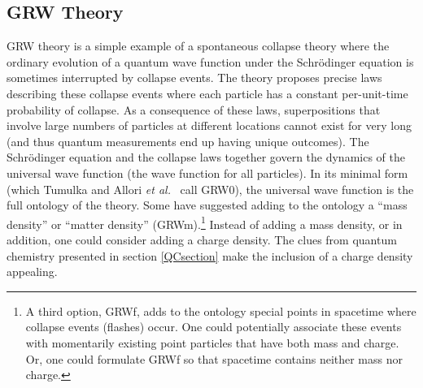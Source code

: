 \documentclass[onecolumn,secnumarabic,amsmath,amssymb,balancelastpage,nofootinbib]{article}
\begin{document}
\subsection{GRW Theory}\label{GRWsection}

GRW theory is a simple example of a spontaneous collapse theory where the ordinary evolution of a quantum wave function under the Schr\"{o}dinger equation is sometimes interrupted by collapse events.  The theory proposes precise laws describing these collapse events where each particle has a constant per-unit-time probability of collapse.  As a consequence of these laws, superpositions that involve large numbers of particles at different locations cannot exist for very long (and thus quantum measurements end up having unique outcomes).  The Schr\"{o}dinger equation and the collapse laws together govern the dynamics of the universal wave function (the wave function for all particles).  In its minimal form (which Tumulka \cite{tumulka2007} and Allori \emph{et al.}\ \cite{allori2008} call GRW$0$), the universal wave function is the full ontology of the theory.  Some have suggested adding to the ontology a ``mass density'' or ``matter density'' (GRWm).\footnote{A third option, GRWf, adds to the ontology special points in spacetime where collapse events (flashes) occur.  One could potentially associate these events with momentarily existing point particles that have both mass and charge.  Or, one could formulate GRWf so that spacetime contains neither mass nor charge.}  Instead of adding a mass density, or in addition, one could consider adding a charge density.  The clues from quantum chemistry presented in section \ref{QCsection} make the inclusion of a charge density appealing.
\end{document}
